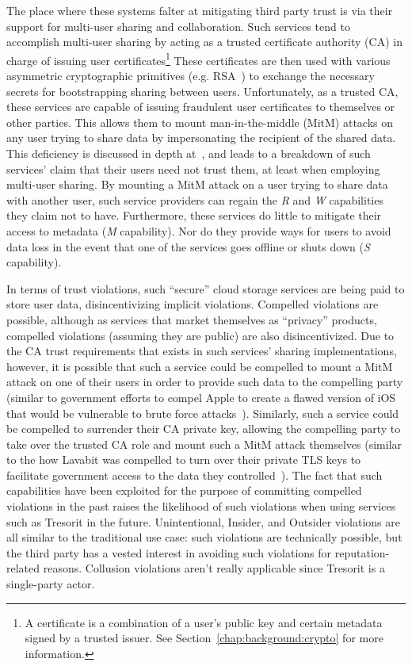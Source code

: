 The place where these systems falter at mitigating third party trust
is via their support for multi-user sharing and collaboration. Such
services tend to accomplish multi-user sharing by acting as a trusted
certificate authority (CA) in charge of issuing user
certificates\footnote{A certificate is a combination of a user's
  public key and certain metadata signed by a trusted issuer. See
  Section~\ref{chap:background:crypto} for more information.} These
certificates are then used with various asymmetric cryptographic
primitives (e.g. RSA~\cite{rivest1978}) to exchange the necessary
secrets for bootstrapping sharing between users. Unfortunately, as a
trusted CA, these services are capable of issuing fraudulent user
certificates to themselves or other parties. This allows them to mount
man-in-the-middle (MitM) attacks on any user trying to share data by
impersonating the recipient of the shared data. This deficiency is
discussed in depth at~\cite{wilson2014}, and leads to a breakdown of
such services' claim that their users need not trust them, at least
when employing multi-user sharing. By mounting a MitM attack on a user
trying to share data with another user, such service providers can
regain the \emph{R} and \emph{W} capabilities they claim not to
have. Furthermore, these services do little to mitigate their access
to metadata (\emph{M} capability). Nor do they provide ways for users
to avoid data loss in the event that one of the services goes offline
or shuts down (\emph{S} capability).

In terms of trust violations, such ``secure'' cloud storage services
are being paid to store user data, disincentivizing implicit
violations. Compelled violations are possible, although as services
that market themselves as ``privacy'' products, compelled violations
(assuming they are public) are also disincentivized. Due to the CA
trust requirements that exists in such services' sharing
implementations, however, it is possible that such a service could be
compelled to mount a MitM attack on one of their users in order to
provide such data to the compelling party (similar to government
efforts to compel Apple to create a flawed version of iOS that would
be vulnerable to brute force attacks~\cite{ars-cookvfbi}). Similarly,
such a service could be compelled to surrender their CA private key,
allowing the compelling party to take over the trusted CA role and
mount such a MitM attack themselves (similar to the how Lavabit was
compelled to turn over their private TLS keys to facilitate government
access to the data they controlled~\cite{levsion-lavabit}). The fact
that such capabilities have been exploited for the purpose of
committing compelled violations in the past raises the likelihood of
such violations when using services such as Tresorit in the
future. Unintentional, Insider, and Outsider violations are all
similar to the traditional use case: such violations are technically
possible, but the third party has a vested interest in avoiding such
violations for reputation-related reasons. Collusion violations aren't
really applicable since Tresorit is a single-party actor.

